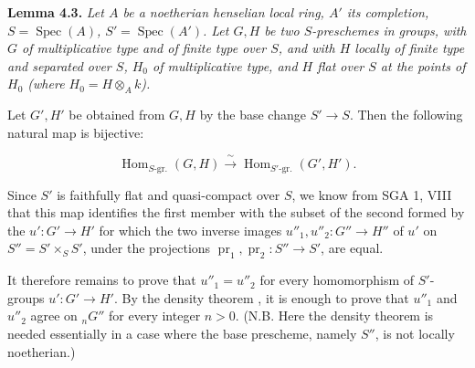 \par\medskip\noindent
\textbf{Lemma 4.3.}\enspace
\begingroup\itshape
Let \(A\) be a noetherian henselian local ring, \(A'\) its completion,
\(S=\operatorname{Spec}(A)\), \(S'=\operatorname{Spec}(A')\). Let \(G,H\) be
two \(S\)-preschemes in groups, with \(G\) of multiplicative type and of
finite type over \(S\), and with \(H\) locally of finite type and separated
over \(S\), \(H_0\) of multiplicative type, and \(H\) flat over \(S\) at the
points of \(H_0\) (where \(H_0=H\otimes_A k\)).

Let \(G',H'\) be obtained from \(G,H\) by the base change \(S'\to S\). Then
the following natural map is bijective:
\par\endgroup
\[
  \operatorname{Hom}_{S\text{-gr.}}(G,H)
  \xrightarrow{\ \sim\ }
  \operatorname{Hom}_{S'\text{-gr.}}(G',H').
\]

Since \(S'\) is faithfully flat and quasi-compact over \(S\), we know from
SGA 1, VIII that this map identifies the first member with the subset of
the second formed by the \(u':G'\to H'\) for which the two inverse images
\(u''_1,u''_2:G''\to H''\) of \(u'\) on
\(S''=S'\times_S S'\), under the projections
\(\operatorname{pr}_1,\operatorname{pr}_2:S''\to S'\), are equal.

It therefore remains to prove that \(u''_1=u''_2\) for every homomorphism of
\(S'\)-groups \(u':G'\to H'\). By the density theorem , it is enough
to prove that \(u''_1\) and \(u''_2\) agree on \({}_nG''\) for every integer
\(n>0\). (N.B. Here the density theorem is needed essentially in a case
where the base prescheme, namely \(S''\), is not locally noetherian.)

